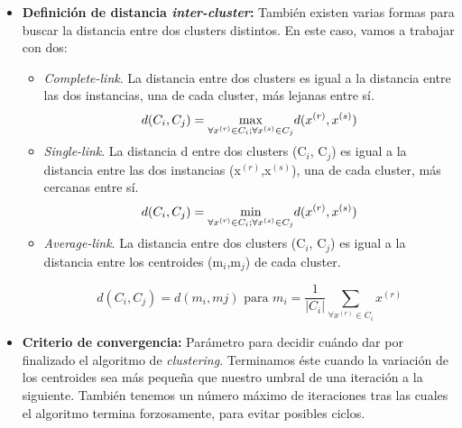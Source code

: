 \documentclass[10pt,a4paper]{article}
\begin{document}
\begin{itemize}
		\item \textbf{Definición de distancia \textit{inter-cluster}:} También existen varias formas para buscar la distancia entre dos clusters distintos. En este caso, vamos a trabajar con dos:
		\begin{itemize}
		    \item \textit{Complete-link}. La distancia entre dos clusters es igual a la distancia entre las dos instancias, una de cada cluster, más lejanas entre sí.
		    \begin{equation}
		    d(C_i,C_j)=\smash{\displaystyle\max_{ \forall x^{(r)}\in C_i ; \forall x^{(s)} \in C_j}} d(x^{(r)},x^{(s)})
	    	\end{equation}
		    \item \textit{Single-link}. La distancia d entre dos clusters (C$_i$, C$_j$) es igual a la distancia entre las dos instancias (x$^{(r)}$,x$^{(s)}$), una de cada cluster, más cercanas entre sí.
		    \begin{equation}
		    d(C_i,C_j)=\smash{\displaystyle\min_{\forall x^{(r)}\in C_i ; \forall x^{(s)} \in C_j}} d(x^{(r)},x^{(s)})
		    \end{equation}
		    \item \textit{Average-link}. La distancia entre dos clusters (C$_i$, C$_j$) es igual a la distancia entre los centroides (m$_i$,m$_j$) de cada cluster. \cite{AliciaPerez}

		    \begin{equation}
		    d(C_i,C_j)=d(m_i,mj) \text{  para  } m_i=\frac{1}{|C_i|}\sum_{\forall x^{(r)} \in C_i} x^{(r)}  
	    	\end{equation}
	    \end{itemize}
	    \item \textbf{Criterio de convergencia:} Parámetro para decidir cuándo dar por finalizado el algoritmo de \textit{clustering}. Terminamos éste cuando la variación de los centroides sea más pequeña que nuestro umbral de una iteración a la siguiente. También tenemos un número máximo de iteraciones tras las cuales el algoritmo termina forzosamente, para evitar posibles ciclos.
	\end{itemize}
\end{document}
